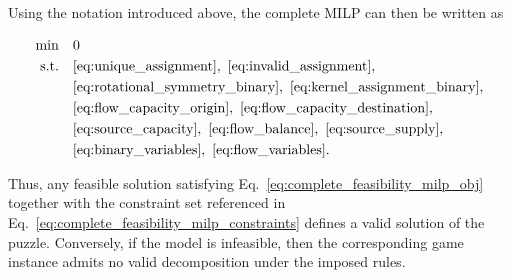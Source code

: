 Using the notation introduced above, the complete MILP can then be written as

\begin{subequations}
\label{eq:complete_feasibility_milp}
\begin{align}
\min \quad & 0 \label{eq:complete_feasibility_milp_obj}\\
\text{s.t.}\quad
& \eqref{eq:unique_assignment},\ \eqref{eq:invalid_assignment}, \notag\\
& \eqref{eq:rotational_symmetry_binary},\ \eqref{eq:kernel_assignment_binary}, \notag\\
& \eqref{eq:flow_capacity_origin},\ \eqref{eq:flow_capacity_destination}, \notag\\
& \eqref{eq:source_capacity},\ \eqref{eq:flow_balance},\ \eqref{eq:source_supply}, \notag\\
& \eqref{eq:binary_variables},\ \eqref{eq:flow_variables}.
\label{eq:complete_feasibility_milp_constraints}
\end{align}
\end{subequations}

Thus, any feasible solution satisfying
Eq.~\eqref{eq:complete_feasibility_milp_obj} together with the constraint set
referenced in Eq.~\eqref{eq:complete_feasibility_milp_constraints} defines a
valid solution of the puzzle. Conversely, if the model is infeasible, then the
corresponding game instance admits no valid decomposition under the imposed
rules.
